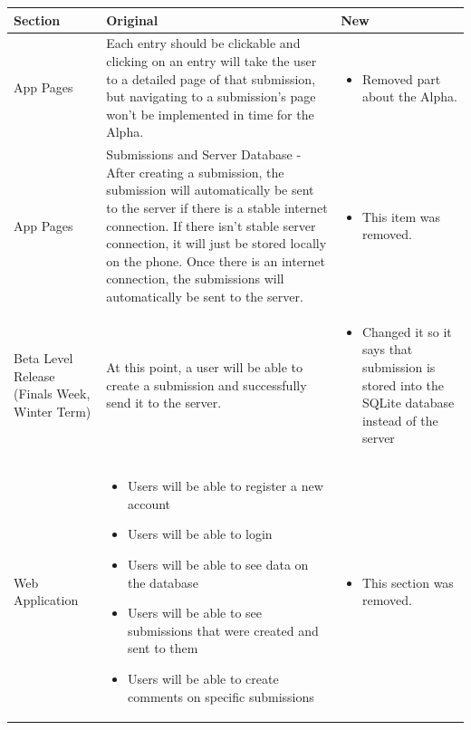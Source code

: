 \documentclass[onecolumn, draftclsnofoot,10pt, compsoc]{IEEEtran}
\begin{document}
\clearpage

\begin{table}
\begin{tabularx}{\textwidth}{|>{\setlength\hsize{.8\hsize}\setlength\linewidth{\hsize}}X|>{\setlength\hsize{1.1\hsize}\setlength\linewidth{\hsize}}X|>{\setlength\hsize{1.1\hsize}\setlength\linewidth{\hsize}}X|}
\hline
Section & Original & New \\
\hline

App Pages
&
 Each entry should be clickable and clicking on an entry will take the user to a detailed page of that submission, but  navigating to a submission's page won't be implemented in time for the Alpha.
&
\begin{itemize}
    \item Removed part about the Alpha.
\end{itemize}
\\

\hline
App Pages 
&
 Submissions and Server Database - After creating a submission, the submission will automatically be sent to the server if there is a stable internet connection. If there isn't stable server connection, it will just be stored locally on the phone. Once there is an internet connection, the submissions will automatically be sent to the server.
&
\begin{itemize}
    \item This item was removed.
\end{itemize}
\\

\hline
Beta Level Release (Finals Week, Winter Term)
&
At this point, a user will be able to create a submission and successfully send it to the server.
&
\begin{itemize}
    \item Changed it so it says that submission is stored into the SQLite database instead of the server
\end{itemize}
\\

\hline
Web Application
&
\begin{itemize}
\item Users will be able to register a new account
\item Users will be able to login
\item Users will be able to see data on the database
\item Users will be able to see submissions that were created and sent to them
\item Users will be able to create comments on specific submissions
\end{itemize}  
&
\begin{itemize}
    \item This section was removed.
\end{itemize}
\\
\hline


\end{tabularx}
\end{table}
\end{document}
